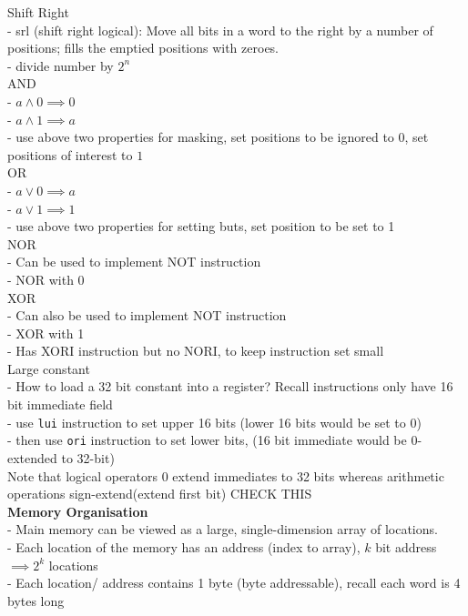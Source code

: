 \documentclass[10pt, a4paper]{article}
\begin{document}
\begin{multicols*}{3}
		Shift Right\\
		- srl (shift right logical): Move all bits in a word to the right by a number of positions; fills the emptied positions with zeroes.\\
		- divide number by $2^n$\\
		
		AND\\
		- $a \wedge 0 \implies 0$\\
		- $a \wedge 1 \implies a$\\
		- use above two properties for masking, set positions to be ignored to $0$, set positions of interest to $1$\\
		OR\\
		- $a \lor 0  \implies a$\\
		- $a \lor 1 \implies 1$\\
		- use above two properties for setting buts, set position to be set to 1\\
		
		NOR\\
		- Can be used to implement NOT instruction\\
		- NOR with 0\\		
		
		XOR\\
		- Can also be used to implement NOT instruction\\
		- XOR with 1\\
		- Has XORI instruction but no NORI, to keep instruction set small\\
		
		Large constant\\
		- How to load a 32 bit constant into a register? Recall instructions only have 16 bit immediate field\\
		- use \texttt{lui} instruction to set upper 16 bits (lower 16 bits would be set to 0)\\
		- then use \texttt{ori} instruction to set lower bits, (16 bit immediate would be 0-extended to 32-bit)\\
		Note that logical operators 0 extend immediates to 32 bits whereas arithmetic operations sign-extend(extend first bit) CHECK THIS\\
		
		\textbf{Memory Organisation}\\
		- Main memory can be viewed as a large, single-dimension array of locations.\\
		- Each location of the memory has an address (index to array), $k$ bit address $\implies 2^k$ locations\\
		- Each location/ address contains 1 byte (byte addressable), recall each word is 4 bytes long\\
		

\end{multicols*}
\end{document}
